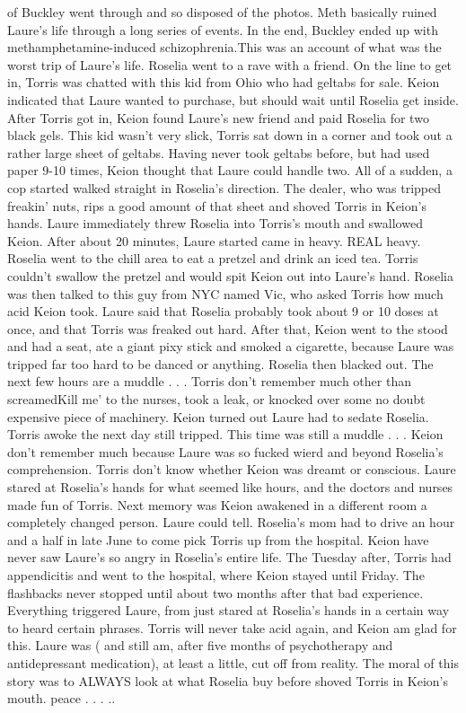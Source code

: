 \documentclass[12pt]{book}
\begin{document}
of Buckley went through and so disposed of the photos. Meth basically ruined Laure's life through a long series of events. In the end, Buckley ended up with methamphetamine-induced schizophrenia.This was an account of what was the worst trip of Laure's life. Roselia went to a rave with a friend. On the line to get in, Torris was chatted with this kid from Ohio who had geltabs for sale. Keion indicated that Laure wanted to purchase, but should wait until Roselia get inside. After Torris got in, Keion found Laure's new friend and paid Roselia for two black gels. This kid wasn't very slick, Torris sat down in a corner and took out a rather large sheet of geltabs. Having never took geltabs before, but had used paper 9-10 times, Keion thought that Laure could handle two. All of a sudden, a cop started walked straight in Roselia's direction. The dealer, who was tripped freakin' nuts, rips a good amount of that sheet and shoved Torris in Keion's hands. Laure immediately threw Roselia into Torris's mouth and swallowed Keion. After about 20 minutes, Laure started came in heavy. REAL heavy. Roselia went to the chill area to eat a pretzel and drink an iced tea. Torris couldn't swallow the pretzel and would spit Keion out into Laure's hand. Roselia was then talked to this guy from NYC named Vic, who asked Torris how much acid Keion took. Laure said that Roselia probably took about 9 or 10 doses at once, and that Torris was freaked out hard. After that, Keion went to the stood and had a seat, ate a giant pixy stick and smoked a cigarette, because Laure was tripped far too hard to be danced or anything. Roselia then blacked out. The next few hours are a muddle . . .  Torris don't remember much other than screamedKill me' to the nurses, took a leak, or knocked over some no doubt expensive piece of machinery. Keion turned out Laure had to sedate Roselia. Torris awoke the next day still tripped. This time was still a muddle . . .  Keion don't remember much because Laure was so fucked wierd and beyond Roselia's comprehension. Torris don't know whether Keion was dreamt or conscious. Laure stared at Roselia's hands for what seemed like hours, and the doctors and nurses made fun of Torris. Next memory was Keion awakened in a different room a completely changed person. Laure could tell. Roselia's mom had to drive an hour and a half in late June to come pick Torris up from the hospital. Keion have never saw Laure's so angry in Roselia's entire life. The Tuesday after, Torris had appendicitis and went to the hospital, where Keion stayed until Friday. The flashbacks never stopped until about two months after that bad experience. Everything triggered Laure, from just stared at Roselia's hands in a certain way to heard certain phrases. Torris will never take acid again, and Keion am glad for this. Laure was ( and still am, after five months of psychotherapy and antidepressant medication), at least a little, cut off from reality. The moral of this story was to ALWAYS look at what Roselia buy before shoved Torris in Keion's mouth. peace . . . ..
\end{document}
